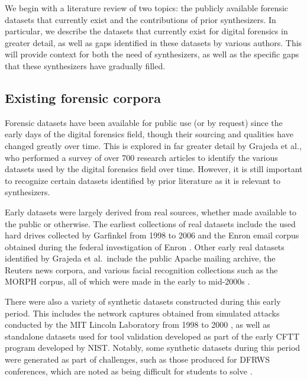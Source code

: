 We begin with a literature review of two topics: the publicly available
forensic datasets that currently exist and the contributions of prior
synthesizers. In particular, we describe the datasets that currently
exist for digital forensics in greater detail, as well as gaps
identified in these datasets by various authors. This will provide
context for both the need of synthesizers, as well as the specific gaps
that these synthesizers have gradually filled.

\subsection{Existing forensic
corpora}\label{existing-forensic-corpora}

Forensic datasets have been available for public use (or by request)
since the early days of the digital forensics field, though their
sourcing and qualities have changed greatly over time. This is explored
in far greater detail by Grajeda et al., who performed a survey of over
700 research articles to identify the various datasets used by the
digital forensics field over time. However, it is still important to
recognize certain datasets identified by prior literature as it is
relevant to synthesizers.

Early datasets were largely derived from real sources, whether made
available to the public or otherwise. The earliest collections of real
datasets include the used hard drives collected by Garfinkel from 1998
to 2006 and the Enron email corpus obtained during the federal
investigation of Enron \cite{garfinkelForensicCorporaChallenge2007}.
Other early real datasets identified by Grajeda et al.~include the
public Apache mailing archive, the Reuters news corpora, and various
facial recognition collections such as the MORPH corpus, all of which
were made in the early to mid-2000s
\cite{yannikosDataCorporaDigital2014,grajedaAvailabilityDatasetsDigital2017}.

There were also a variety of synthetic datasets constructed during this
early period. This includes the network captures obtained from simulated
attacks conducted by the MIT Lincoln Laboratory from 1998 to 2000
\cite{garfinkelForensicCorporaChallenge2007}, as well as standalone
datasets used for tool validation developed as part of the early CFTT
program developed by NIST. Notably, some synthetic datasets during this
period were generated as part of challenges, such as those produced for
DFRWS conferences, which are noted as being difficult for students to
solve \cite{woodsCreatingRealisticCorpora2011}.


